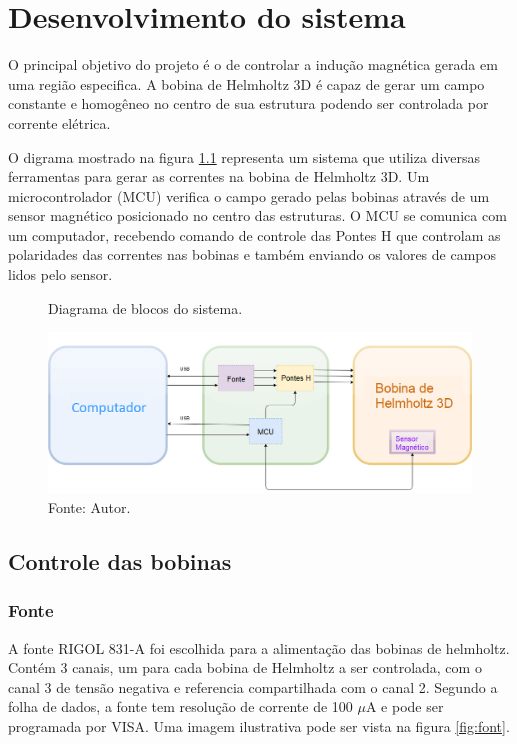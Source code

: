 \chapter{Desenvolvimento do sistema}

O principal objetivo do projeto é o de controlar a indução magnética gerada em uma região especifica. A bobina de Helmholtz 3D é capaz de gerar um campo constante e homogêneo no centro de sua estrutura podendo ser controlada por corrente elétrica.

O digrama mostrado na figura \ref{fig:diag2} representa um sistema que utiliza diversas ferramentas para gerar as correntes na bobina de Helmholtz 3D. Um microcontrolador (MCU) verifica o campo gerado pelas bobinas através de um sensor magnético posicionado no centro das estruturas. O MCU se comunica com um computador, recebendo comando de controle das Pontes H que controlam as polaridades das correntes nas bobinas e também enviando os valores de campos lidos pelo sensor.

\begin{figure}[H]
    \centering
     \caption{Diagrama de blocos do sistema.}
     \includegraphics[width=1\textwidth]{./img/diagramas/Blocks diagram 2.png}
     \caption*{Fonte: Autor.}
     \label{fig:diag2}
\end{figure}

\section{Controle das bobinas}

\subsection{Fonte}

A fonte RIGOL 831-A \cite{RG831A} foi escolhida para a alimentação das bobinas de helmholtz. Contém 3 canais, um para cada bobina de Helmholtz a ser controlada, com o canal 3 de tensão negativa e referencia compartilhada com o canal 2. Segundo a folha de dados, a fonte tem resolução de corrente de 100 $\mu$A \cite{RG831A} e pode ser programada por VISA. Uma imagem ilustrativa pode ser vista na figura \ref{fig:font}.

